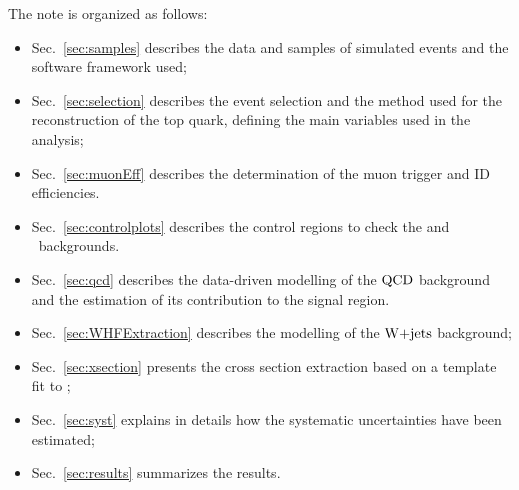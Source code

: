 The note is organized as follows:
\begin{itemize}
\item Sec.~\ref{sec:samples} describes the data and samples of simulated events and the software framework used;
\item Sec.~\ref{sec:selection} describes the event selection and the method used for the reconstruction of the top quark, defining the main variables
used in the analysis;
\item Sec.~\ref{sec:muonEff} describes the determination of the muon trigger
  and ID efficiencies.
\item Sec.~\ref{sec:controlplots} describes the control regions to check the \wjets and \ttbar~backgrounds.
\item Sec.~\ref{sec:qcd} describes the data-driven modelling of the $\rm QCD$ background and the estimation of its contribution to the signal region.
\item Sec.~\ref{sec:WHFExtraction} describes the modelling of the $\textrm{W+jets}$ background;
\item Sec.~\ref{sec:xsection} presents the cross section extraction based on a template fit to \etalj;
\item Sec.~\ref{sec:syst} explains in details how the systematic uncertainties have been estimated; 
\item Sec.~\ref{sec:results} summarizes the results.
\end{itemize}



%

